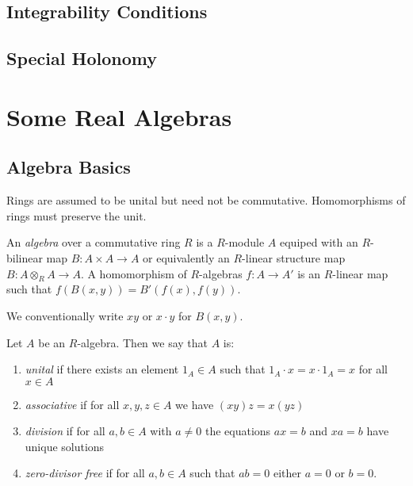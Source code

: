 \documentclass[12pt]{extarticle}
\begin{document}
\subsection{Integrability Conditions}

\subsection{Special Holonomy}

\section{Some Real Algebras}

\subsection{Algebra Basics}

\begin{rmk}
Rings are assumed to be unital but need not be commutative. Homomorphisms of rings must preserve the unit.
\end{rmk}

\begin{defn}
An \textit{algebra} over a commutative ring $R$ is a $R$-module $A$ equiped with an $R$-bilinear map $B : A \times A \to A$ or equivalently an $R$-linear structure map $B : A \otimes_R A \to A$. A homomorphism of $R$-algebras $f : A \to A'$ is an $R$-linear map such that $f(B(x,y)) = B'(f(x), f(y))$.
\end{defn}

\begin{rmk}
We conventionally write $xy$ or $x \cdot y$ for $B(x,y)$.
\end{rmk}


\begin{defn}
Let $A$ be an $R$-algebra. Then we say that $A$ is:
\begin{enumerate}
\item \textit{unital} if there exists an element $1_A \in A$ such that $1_A \cdot x = x \cdot 1_A = x$ for all $x \in A$
\item \textit{associative} if for all $x,y,z \in A$ we have $(xy)z = x(yz)$
\item \textit{division} if for all $a, b \in A$ with $a \neq 0$ the equations $ax = b$ and $xa = b$ have unique solutions
\item \textit{zero-divisor free} if for all $a, b \in A$ such that $ab = 0$ either $a = 0$ or $b = 0$.
\end{enumerate}
\end{defn}
\end{document}
